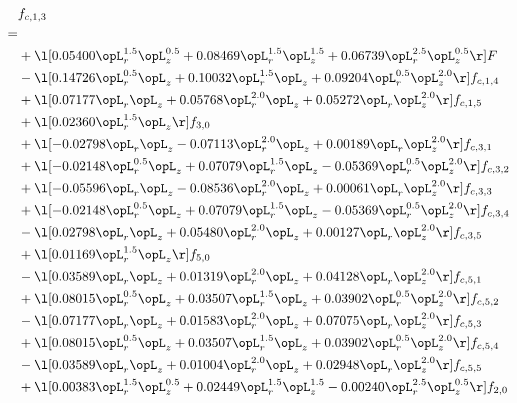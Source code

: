 \begin{alignat}{2} 
\label{eq:f_13_2} 
& f_{c,1,3} \nonumber \\ 
 = \\ 
& + \l[  0.05400 \opL_r^{1.5} \opL_z^{0.5} +  0.08469 \opL_r^{1.5} \opL_z^{1.5} +  0.06739 \opL_r^{2.5} \opL_z^{0.5}  \r] F \nonumber \\ 
& - \l[  0.14726 \opL_r^{0.5} \opL_z +  0.10032 \opL_r^{1.5} \opL_z +  0.09204 \opL_r^{0.5} \opL_z^{2.0}  \r] f_{c,1,4} \nonumber \\ 
& + \l[  0.07177 \opL_r \opL_z +  0.05768 \opL_r^{2.0} \opL_z +  0.05272 \opL_r \opL_z^{2.0}  \r] f_{c,1,5} \nonumber \\ 
& + \l[  0.02360 \opL_r^{1.5} \opL_z  \r] f_{3,0} \nonumber \\ 
& + \l[  -0.02798 \opL_r \opL_z   -0.07113 \opL_r^{2.0} \opL_z +  0.00189 \opL_r \opL_z^{2.0}  \r] f_{c,3,1} \nonumber \\ 
& + \l[  -0.02148 \opL_r^{0.5} \opL_z +  0.07079 \opL_r^{1.5} \opL_z   -0.05369 \opL_r^{0.5} \opL_z^{2.0}  \r] f_{c,3,2} \nonumber \\ 
& + \l[  -0.05596 \opL_r \opL_z   -0.08536 \opL_r^{2.0} \opL_z +  0.00061 \opL_r \opL_z^{2.0}  \r] f_{c,3,3} \nonumber \\ 
& + \l[  -0.02148 \opL_r^{0.5} \opL_z +  0.07079 \opL_r^{1.5} \opL_z   -0.05369 \opL_r^{0.5} \opL_z^{2.0}  \r] f_{c,3,4} \nonumber \\ 
& - \l[  0.02798 \opL_r \opL_z +  0.05480 \opL_r^{2.0} \opL_z +  0.00127 \opL_r \opL_z^{2.0}  \r] f_{c,3,5} \nonumber \\ 
& + \l[  0.01169 \opL_r^{1.5} \opL_z  \r] f_{5,0} \nonumber \\ 
& - \l[  0.03589 \opL_r \opL_z +  0.01319 \opL_r^{2.0} \opL_z +  0.04128 \opL_r \opL_z^{2.0}  \r] f_{c,5,1} \nonumber \\ 
& + \l[  0.08015 \opL_r^{0.5} \opL_z +  0.03507 \opL_r^{1.5} \opL_z +  0.03902 \opL_r^{0.5} \opL_z^{2.0}  \r] f_{c,5,2} \nonumber \\ 
& - \l[  0.07177 \opL_r \opL_z +  0.01583 \opL_r^{2.0} \opL_z +  0.07075 \opL_r \opL_z^{2.0}  \r] f_{c,5,3} \nonumber \\ 
& + \l[  0.08015 \opL_r^{0.5} \opL_z +  0.03507 \opL_r^{1.5} \opL_z +  0.03902 \opL_r^{0.5} \opL_z^{2.0}  \r] f_{c,5,4} \nonumber \\ 
& - \l[  0.03589 \opL_r \opL_z +  0.01004 \opL_r^{2.0} \opL_z +  0.02948 \opL_r \opL_z^{2.0}  \r] f_{c,5,5} \nonumber \\ 
& + \l[  0.00383 \opL_r^{1.5} \opL_z^{0.5} +  0.02449 \opL_r^{1.5} \opL_z^{1.5}   -0.00240 \opL_r^{2.5} \opL_z^{0.5}  \r] f_{2,0} \nonumber \\ 

\end{alignat}

